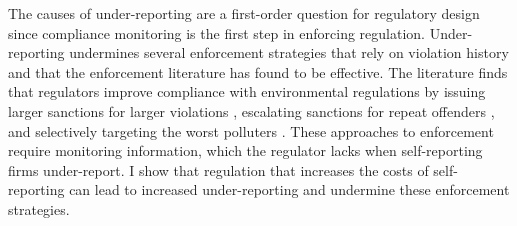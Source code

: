 \documentclass[12pt]{article}
\begin{document}
The causes of under-reporting are a first-order question for regulatory design since compliance monitoring is the first step in enforcing regulation. Under-reporting undermines several enforcement strategies that rely on violation history and that the enforcement literature has found to be effective. The literature finds that regulators improve compliance with environmental regulations by issuing larger sanctions for larger violations \parencite{shimshack2014economics, harford1987self}, escalating sanctions for repeat offenders \parencite{blundell2020escalation, blundell2020threats}, and selectively targeting the worst polluters \parencite{duflo2018value}. These approaches to enforcement require monitoring information, which the regulator lacks when self-reporting firms under-report. I show that regulation that increases the costs of self-reporting can lead to increased under-reporting and undermine these enforcement strategies.
\end{document}
